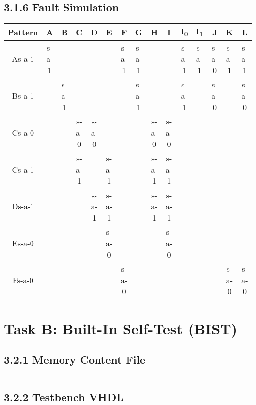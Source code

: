 \documentclass[11pt]{report}
\begin{document}
\section*{3.1.6 Fault Simulation}
\begin{tabular}{|c||c|c|c|c|c|c|c|c|c|c|c|c|c|c|}
\hline
Pattern & A & B & C & D & E & F & G & H & I & I\textsubscript{0} & I\textsubscript{1} & J & K & L \\
\hline
\hline
As-a-1 & s-a-1 & & & & & s-a-1 & s-a-1 & & & s-a-1 & s-a-1 & s-a-0 & s-a-1 & s-a-1 \\
\hline
Bs-a-1 & & s-a-1 & & & & & s-a-1 & & & s-a-1 & & s-a-0 & & s-a-0 \\
\hline
Cs-a-0 & & & s-a-0 & s-a-0 & & & & s-a-0 & s-a-0 & & & & & \\
\hline
Cs-a-1 & & & s-a-1 & & s-a-1 & & & s-a-1 & s-a-1 & & & & & \\
\hline
Ds-a-1 & & & & s-a-1 & s-a-1 & & & s-a-1 & s-a-1 & & & & & \\
\hline
Es-a-0 & & & & & s-a-0 & & & & s-a-0 & & & & & \\
\hline
Fs-a-0 & & & & & & s-a-0 & & & & & & & s-a-0 & s-a-0 \\
\hline
\end{tabular}



\chapter*{Task B: Built-In Self-Test (BIST)}


\section*{3.2.1 Memory Content File}
\inputminted{text}{"../../DE_Lab4/DE_Lab4.srcs/sources_1/imports/Desktop/lab4_coefficient.coe"}


\section*{3.2.2 Testbench VHDL}
\inputminted[firstline=23]{vhdl}{"../../Lab3TaskBP3/Lab3TaskBP3.srcs/sources_1/imports/sources_1/imports/Digital Engineering/Algorithm.vhd"}
\end{document}
